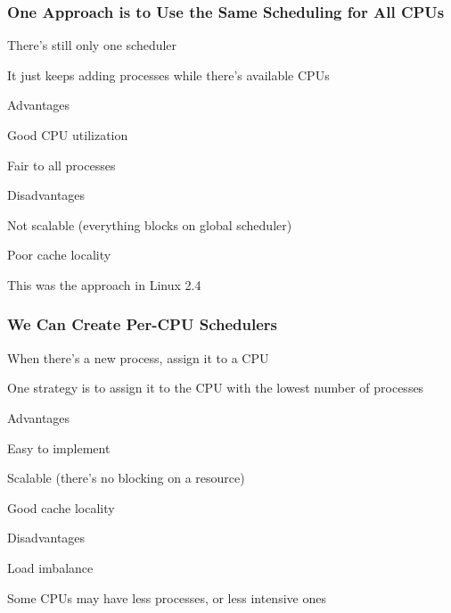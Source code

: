   \begin{frame}
    \frametitle{One Approach is to Use the Same Scheduling for All CPUs}

    There's still only one scheduler

    \hspace{2em} It just keeps adding processes while there's available CPUs

    \vspace{2em}

    Advantages

    \hspace{2em} Good CPU utilization

    \hspace{2em} Fair to all processes

    \vspace{2em}

    Disadvantages

    \hspace{2em} Not scalable (everything blocks on global scheduler)

    \hspace{2em} Poor cache locality

    \vspace{2em}

    This was the approach in Linux 2.4
  \end{frame}

  \begin{frame}
    \frametitle{We Can Create Per-CPU Schedulers}

    When there's a new process, assign it to a CPU

    \hspace{2em} One strategy is to assign it to the CPU with the lowest number of processes

    \vspace{2em}

    Advantages

    \hspace{2em} Easy to implement

    \hspace{2em} Scalable (there's no blocking on a resource)

    \hspace{2em} Good cache locality

    \vspace{2em}

    Disadvantages

    \hspace{2em} Load imbalance

    \hspace{4em} Some CPUs may have less processes, or less intensive ones
  \end{frame}

